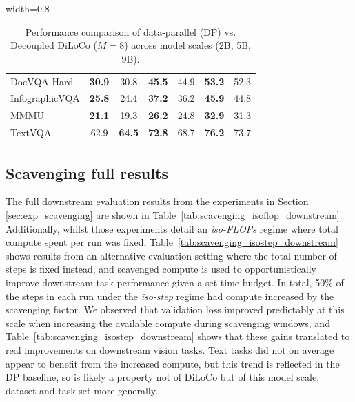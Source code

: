 \documentclass[11pt, a4paper, twocolumn, copyright, google]{google}
\begin{document}
\begin{table}[!ht]
\begin{adjustbox}{width=0.8\textwidth}
\begin{tabular}{l cc cc cc}
        DocVQA-Hard     & \textbf{30.9} & 30.8 & \textbf{45.5} & 44.9 & \textbf{53.2} & 52.3 \\
        InfographicVQA  & \textbf{25.8} & 24.4 & \textbf{37.2} & 36.2 & \textbf{45.9} & 44.8 \\
        MMMU            & \textbf{21.1} & 19.3 & \textbf{26.2} & 24.8 & \textbf{32.9} & 31.3 \\
        TextVQA         & 62.9 & \textbf{64.5} & \textbf{72.8} & 68.7 & \textbf{76.2} & 73.7 \\
        \bottomrule
    \end{tabular}
    \end{adjustbox}
    \caption{Performance comparison of data-parallel (DP) vs. Decoupled DiLoCo ($M=8$) across model scales (2B, 5B, 9B).}
    \label{tab:exp_scaling}
\end{table}

\subsection{Scavenging full results}
\label{sec:appendix_scavenging_results}

The full downstream evaluation results from the experiments in Section \ref{sec:exp_scavenging} are shown in Table~\ref{tab:scavenging_isoflop_downstream}. Additionally, whilst those experiments detail an \emph{iso-FLOPs} regime where total compute spent per run was fixed, Table~\ref{tab:scavenging_isostep_downstream} shows results from an alternative evaluation setting where the total number of steps is fixed instead, and scavenged compute is used to opportunistically improve downstream task performance given a set time budget. In total, 50\% of the steps in each run under the \emph{iso-step} regime had compute increased by the scavenging factor. We observed that validation loss improved predictably at this scale when increasing the available compute during scavenging windows, and Table~\ref{tab:scavenging_isostep_downstream} shows that these gains translated to real improvements on downstream vision tasks. Text tasks did not on average appear to benefit from the increased compute, but this trend is reflected in the DP baseline, so is likely a property not of DiLoCo but of this model scale, dataset and task set more generally.
\end{document}
